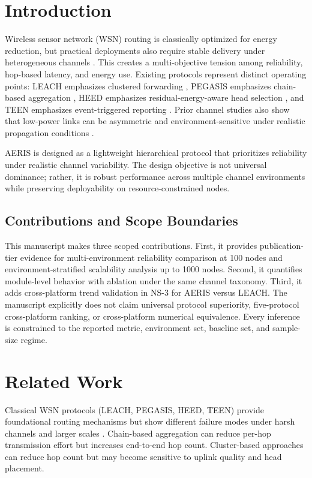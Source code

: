 \documentclass[sensors,article,submit,moreauthors,pdftex]{Definitions/mdpi}
\begin{document}
\section{Introduction}
Wireless sensor network (WSN) routing is classically optimized for energy reduction, but practical deployments also require stable delivery under heterogeneous channels \cite{Akyildiz2002Survey,Rault2016Energy,Kandris2020}. This creates a multi-objective tension among reliability, hop-based latency, and energy use. Existing protocols represent distinct operating points: LEACH emphasizes clustered forwarding \cite{Heinzelman2000LEACH}, PEGASIS emphasizes chain-based aggregation \cite{Lindsey2002PEGASIS}, HEED emphasizes residual-energy-aware head selection \cite{Younis2004HEED}, and TEEN emphasizes event-triggered reporting \cite{Manjeshwar2001TEEN}. Prior channel studies also show that low-power links can be asymmetric and environment-sensitive under realistic propagation conditions \cite{Zuniga2004,Zuniga2007Asymmetry,Baccour2012RLQE}.

AERIS is designed as a lightweight hierarchical protocol that prioritizes reliability under realistic channel variability. The design objective is not universal dominance; rather, it is robust performance across multiple channel environments while preserving deployability on resource-constrained nodes.

\subsection*{Contributions and Scope Boundaries}
This manuscript makes three scoped contributions. First, it provides publication-tier evidence for multi-environment reliability comparison at 100 nodes and environment-stratified scalability analysis up to 1000 nodes. Second, it quantifies module-level behavior with ablation under the same channel taxonomy. Third, it adds cross-platform trend validation in NS-3 for AERIS versus LEACH. The manuscript explicitly does not claim universal protocol superiority, five-protocol cross-platform ranking, or cross-platform numerical equivalence. Every inference is constrained to the reported metric, environment set, baseline set, and sample-size regime.

\section{Related Work}
Classical WSN protocols (LEACH, PEGASIS, HEED, TEEN) provide foundational routing mechanisms but show different failure modes under harsh channels and larger scales \cite{Heinzelman2002LEACH,Lindsey2002PEGASIS,Younis2004HEED,Kandris2020}. Chain-based aggregation can reduce per-hop transmission effort but increases end-to-end hop count. Cluster-based approaches can reduce hop count but may become sensitive to uplink quality and head placement.
\end{document}
